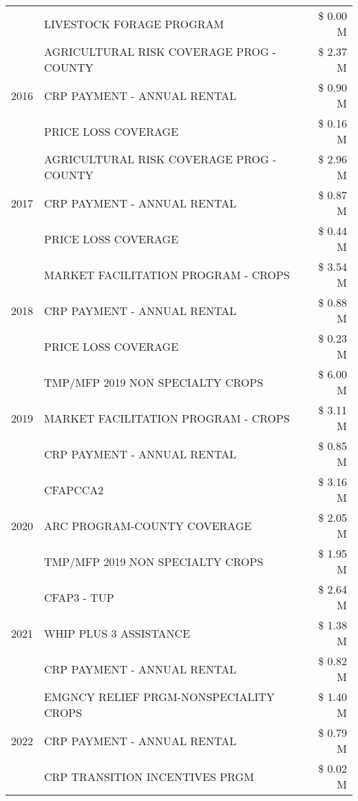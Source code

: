 \begin{tabular}{llr}
 & LIVESTOCK FORAGE PROGRAM & \$ 0.00 M \\
\cline{1-3}
\multirow[t]{3}{*}{2016} & AGRICULTURAL RISK COVERAGE PROG - COUNTY & \$ 2.37 M \\
 & CRP PAYMENT - ANNUAL RENTAL & \$ 0.90 M \\
 & PRICE LOSS COVERAGE & \$ 0.16 M \\
\cline{1-3}
\multirow[t]{3}{*}{2017} & AGRICULTURAL RISK COVERAGE PROG - COUNTY & \$ 2.96 M \\
 & CRP PAYMENT - ANNUAL RENTAL & \$ 0.87 M \\
 & PRICE LOSS COVERAGE & \$ 0.44 M \\
\cline{1-3}
\multirow[t]{3}{*}{2018} & MARKET FACILITATION PROGRAM - CROPS & \$ 3.54 M \\
 & CRP PAYMENT - ANNUAL RENTAL & \$ 0.88 M \\
 & PRICE LOSS COVERAGE & \$ 0.23 M \\
\cline{1-3}
\multirow[t]{3}{*}{2019} & TMP/MFP 2019 NON SPECIALTY CROPS & \$ 6.00 M \\
 & MARKET FACILITATION PROGRAM - CROPS & \$ 3.11 M \\
 & CRP PAYMENT - ANNUAL RENTAL & \$ 0.85 M \\
\cline{1-3}
\multirow[t]{3}{*}{2020} & CFAPCCA2 & \$ 3.16 M \\
 & ARC PROGRAM-COUNTY COVERAGE & \$ 2.05 M \\
 & TMP/MFP 2019 NON SPECIALTY CROPS & \$ 1.95 M \\
\cline{1-3}
\multirow[t]{3}{*}{2021} & CFAP3 - TUP & \$ 2.64 M \\
 & WHIP PLUS 3 ASSISTANCE & \$ 1.38 M \\
 & CRP PAYMENT - ANNUAL RENTAL & \$ 0.82 M \\
\cline{1-3}
\multirow[t]{3}{*}{2022} & EMGNCY RELIEF PRGM-NONSPECIALITY CROPS & \$ 1.40 M \\
 & CRP PAYMENT - ANNUAL RENTAL & \$ 0.79 M \\
 & CRP TRANSITION INCENTIVES PRGM & \$ 0.02 M \\
\cline{1-3}
\bottomrule
\end{tabular}
